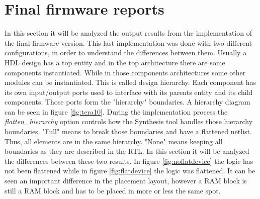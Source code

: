 \section{Final firmware reports}
In this section it will be analyzed the output results from the implementation of the final firmware version. This last implementation was done with two different configurations, in order to understand the differences between them.
Usually a HDL design has a top entity and in the top architecture there are some components instantiated. While in those components architectures some other modules can be instantiated. This is called design hierarchy. Each component has its own input/output ports used to interface with its parents entity and its child components. Those ports form the "hierarchy" boundaries. A hierarchy diagram can be seen in figure \ref{fig:tera10}.
During the implementation process the \textit{flatten\_hierarchy} option controls how the Synthesis tool handles those hierarchy boundaries.
"Full" means to break those boundaries and have a flattened netlist. Thus, all elements are in the same hierarchy. "None" means keeping all boundaries as they are described in the RTL.
In this section it will be analyzed the differences between these two results. In figure \ref{fig:noflatdevice} the logic has not been flattened while in figure \ref{fig:flatdevice} the logic was flattened. It can be seen an important difference in the placement layout, however a RAM block is still a RAM block and has to be placed in more or less the same spot.

